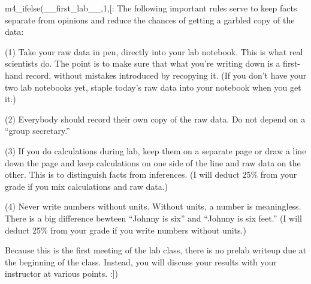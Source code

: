 m4_ifelse(__first_lab__,1,[:
The following important rules serve to keep facts separate
from opinions and reduce the chances of getting a garbled copy of the data:

(1) Take your raw data in pen, directly into your lab
notebook. This is what real scientists do. The point is
to make sure that what you're writing down is a first-hand
record, without mistakes introduced by recopying it.
(If you don't have your two lab notebooks yet,
staple today's raw data into your notebook when you get it.)

(2) Everybody should record their own copy of the raw data.
Do not depend on a ``group secretary.''

(3) If you do calculations during lab, keep them on a
separate page or draw a line down the page and keep
calculations on one side of the line and raw data on the
other. This is to distinguish facts from inferences.
(I will deduct 25\% from your grade if you mix calculations and raw data.)

(4) Never write numbers without units. Without units, a number is
meaningless. There is a big difference bewteen ``Johnny is six''
and ``Johnny is six feet.'' 
(I will deduct 25\% from your grade if you write numbers without units.)

Because this is the first meeting of the lab class, there is
no prelab writeup due at the beginning of the class. 
Instead, you will discuss your results with your instructor
at various points.
:])

